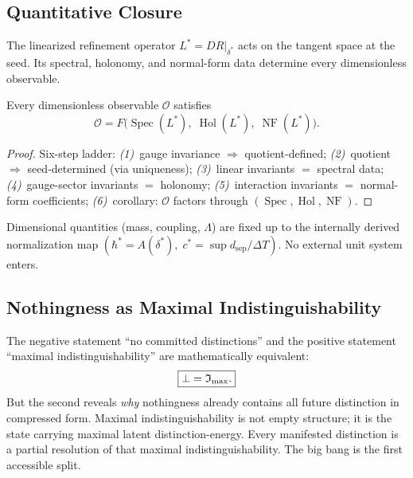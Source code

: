 \subsection{Quantitative Closure}
\label{sec:forcing:closure}

The linearized refinement operator $L^* = DR|_{\delta^*}$ acts on the
tangent space at the seed.  Its spectral, holonomy, and normal-form data
determine every dimensionless observable.

\begin{theorem}
\label{thm:observable-decomp}
Every dimensionless observable $\mathcal{O}$ satisfies
\[
  \mathcal{O} = F\bigl(\operatorname{Spec}(L^*),\;
  \operatorname{Hol}(L^*),\;\operatorname{NF}(L^*)\bigr).
\]
\begin{proof}
Six-step ladder:
\emph{(1)}~gauge invariance $\Rightarrow$ quotient-defined;
\emph{(2)}~quotient $\Rightarrow$ seed-determined (via uniqueness);
\emph{(3)}~linear invariants $=$ spectral data;
\emph{(4)}~gauge-sector invariants $=$ holonomy;
\emph{(5)}~interaction invariants $=$ normal-form coefficients;
\emph{(6)}~corollary: $\mathcal{O}$ factors through
$(\operatorname{Spec}, \operatorname{Hol}, \operatorname{NF})$.
\end{proof}
\end{theorem}

Dimensional quantities (mass, coupling, $\Lambda$) are fixed up to the
internally derived normalization map $(\hbar^* = A(\delta^*),\;
c^* = \sup d_\text{sep}/\Delta T)$.  No external unit system enters.

\subsection{Nothingness as Maximal Indistinguishability}
\label{sec:forcing:imax}

The negative statement ``no committed distinctions'' and the positive
statement ``maximal indistinguishability'' are mathematically equivalent:
\[
\boxed{\bot = \mathfrak{I}_{\max}.}
\]
But the second reveals \emph{why} nothingness already contains all future
distinction in compressed form.  Maximal indistinguishability is not empty
structure; it is the state carrying maximal latent distinction-energy.
Every manifested distinction is a partial resolution of that maximal
indistinguishability.  The big bang is the first accessible split.

